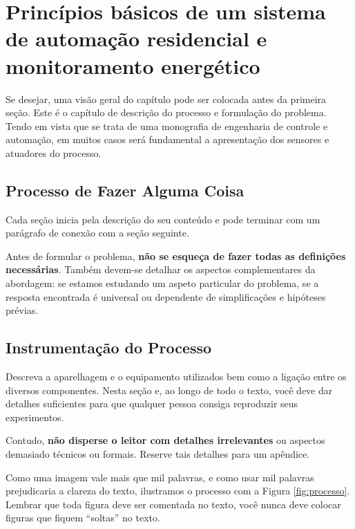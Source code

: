 \chapter[Princípios]{Princípios básicos de um sistema
de automação residencial e monitoramento energético}
\label{chap:principios}

Se desejar, uma visão geral do capítulo pode ser colocada antes da primeira seção. Este é o capítulo de descrição do processo e formulação do problema. Tendo em vista que se trata de uma monografia de engenharia de controle e automação, em muitos casos será fundamental a apresentação dos sensores e atuadores do processo.

\section{Processo de Fazer Alguma Coisa}
\label{sec:hist}

Cada seção inicia pela descrição do seu conteúdo e pode terminar com um parágrafo de conexão com a seção seguinte. 

Antes de formular o problema, \textbf{não se esqueça de fazer todas as definições necessárias}. Também devem-se detalhar os aspectos complementares da abordagem: se estamos estudando um aspeto particular do problema, se a resposta encontrada é universal ou dependente de simplificações e hipóteses prévias.


\section{Instrumentação do Processo}
\label{sec:instrumentação}

Descreva a aparelhagem e o equipamento utilizados bem como a ligação entre os diversos componentes. Nesta seção e, ao longo de todo o texto, você deve dar detalhes suficientes para que qualquer pessoa consiga reproduzir seus experimentos.

Contudo, \textbf{não disperse o leitor com detalhes irrelevantes} ou aspectos
demasiado técnicos ou formais. Reserve tais detalhes para um
apêndice.

Como uma imagem vale mais que mil palavras, e como usar mil palavras prejudicaria a clareza do texto, ilustramos o processo com a Figura \ref{fig:processo}. Lembrar que toda figura deve ser comentada no texto, você nunca deve colocar figuras que fiquem ``soltas'' no texto.  

